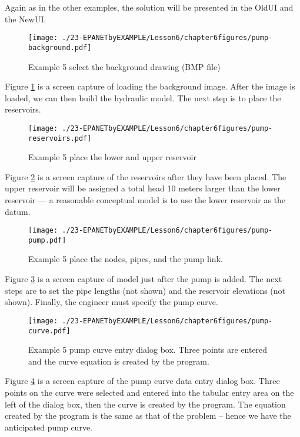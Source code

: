 Again as in the other examples, the solution will be presented in the OldUI and the NewUI.

\begin{figure}[h!] %
   \centering
   \texttt{[image: ./23-EPANETbyEXAMPLE/Lesson6/chapter6figures/pump-background.pdf]} 
   \caption{Example 5 select the background drawing (BMP file)}
   \label{fig:pump-background.pdf}
\end{figure}
Figure \ref{fig:pump-background.pdf} is a screen capture of loading the background image.   After the image is loaded, we can then build the hydraulic model.  The next step is to place the reservoirs.


\begin{figure}[h!] %
   \centering
   \texttt{[image: ./23-EPANETbyEXAMPLE/Lesson6/chapter6figures/pump-reservoirs.pdf]} 
   \caption{Example 5 place the lower and upper reservoir}
   \label{fig:pump-reservoirs.pdf}
\end{figure}
Figure \ref{fig:pump-reservoirs.pdf} is a screen capture of the reservoirs after they have been placed.  The upper reservoir will be assigned a total head 10 meters larger than the lower reservoir --- a reasonable conceptual model is to use the lower reservoir as the datum.
\newpage

\begin{figure}[h!] %
   \centering
   \texttt{[image: ./23-EPANETbyEXAMPLE/Lesson6/chapter6figures/pump-pump.pdf]} 
   \caption{Example 5 place the nodes, pipes, and the pump link.}
   \label{fig:pump-pump.pdf}
\end{figure}
Figure \ref{fig:pump-pump.pdf} is a screen capture of model just after the pump is added.   The next steps are to set the pipe lengths (not shown) and the reservoir elevations (not shown).   Finally, the engineer must specify the pump curve.
\newpage

\begin{figure}[h!] %
   \centering
   \texttt{[image: ./23-EPANETbyEXAMPLE/Lesson6/chapter6figures/pump-curve.pdf]} 
   \caption{Example 5 pump curve entry dialog box.  Three points are entered and the curve equation is created by the program.}
   \label{fig:pump-curve.pdf}
\end{figure}
Figure \ref{fig:pump-curve.pdf} is a screen capture of the pump curve data entry dialog box.   Three points on the curve were selected and entered into the tabular entry area on the left of the dialog box, then the curve is created by the program.  The equation created by the program is the same as that of the problem -- hence we have the anticipated pump curve.
\newpage

